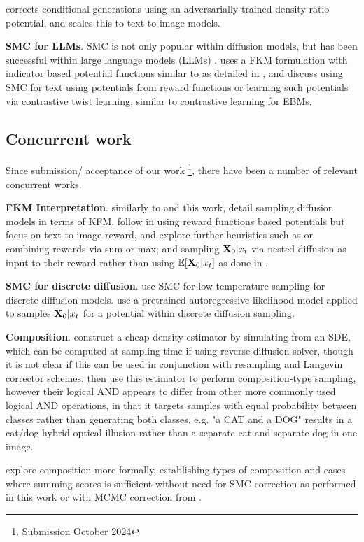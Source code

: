 \cite{liu2024correcting} corrects conditional generations using an adversarially trained density ratio potential, and scales this to text-to-image models. 


\textbf{SMC for LLMs}. SMC is not only popular within diffusion models, but has been successful within large language models (LLMs) \citep{lew2023sequential, zhao2024probabilistic}. \cite{lew2023sequential} uses a FKM formulation with indicator based potential functions similar to as detailed in , and \cite{zhao2024probabilistic} discuss using SMC for text using potentials from reward functions or learning such potentials via contrastive twist learning, similar to contrastive learning for EBMs.

\subsection{Concurrent work} Since submission/ acceptance of our work \footnote{Submission October 2024}, there have been a number of relevant concurrent works. 

\textbf{FKM Interpretation}. \cite{singhal2025general} similarly to \cite{zhao2024conditional} and this work, detail sampling diffusion models in terms of KFM. \cite{singhal2025general} follow \cite{li2024derivative} in using reward functions based potentials but focus on text-to-image reward, and explore further heuristics such as or combining rewards via sum or max; and sampling $\mathbf{X}_0|x_t$ via nested diffusion \citep{elata2024nested} as input to their reward rather than using $\mathbb{E}[\mathbf{X}_0|x_t]$ as done in \cite{li2024derivative}.

\textbf{SMC for discrete diffusion}.  \cite{lee2025debiasing} use SMC for low temperature sampling for discrete diffusion models. \cite{xu2024energy} use a pretrained autoregressive likelihood model applied to samples $\mathbf{X}_0|x_t$ for a potential within discrete diffusion sampling.

\textbf{Composition}. \cite{skreta2024superposition} construct a cheap density estimator by simulating from an SDE, which can be computed at sampling time if using reverse diffusion solver, though it is not clear if this can be used in conjunction with resampling and Langevin corrector schemes. \cite{skreta2024superposition} then use this estimator to perform composition-type sampling, however their logical \textsc{AND} appears to differ from other more commonly used logical \textsc{AND} operations, in that it targets samples with equal probability between classes rather than generating both classes, e.g. "a CAT and a DOG" results in a cat/dog hybrid optical illusion rather than a separate cat and separate dog in one image. 

\cite{bradley2025mechanisms} explore composition more formally, establishing types of composition and cases where summing scores is sufficient without need for SMC correction as performed in this work or with MCMC correction from \citep{du2023reduce}.



